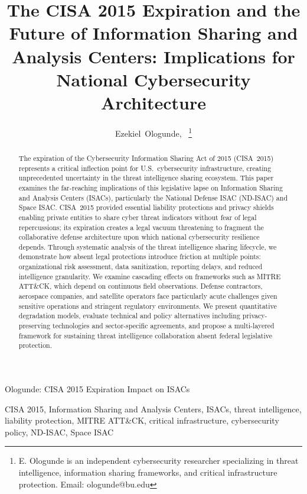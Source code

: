 \documentclass[journal]{IEEEtran}
\begin{document}
\title{The CISA 2015 Expiration and the Future of Information Sharing and Analysis Centers: Implications for National Cybersecurity Architecture}

\author{Ezekiel~Ologunde,~
\thanks{E. Ologunde is an independent cybersecurity researcher specializing in threat intelligence, information sharing frameworks, and critical infrastructure protection. Email: ologunde@bu.edu}}

\markboth{}%
{Ologunde: CISA 2015 Expiration Impact on ISACs}

\maketitle

\begin{abstract}
The expiration of the Cybersecurity Information Sharing Act of 2015 (CISA~2015) represents a critical inflection point for U.S.\ cybersecurity infrastructure, creating unprecedented uncertainty in the threat intelligence sharing ecosystem. This paper examines the far-reaching implications of this legislative lapse on Information Sharing and Analysis Centers (ISACs), particularly the National Defense ISAC (ND-ISAC) and Space ISAC. CISA~2015 provided essential liability protections and privacy shields enabling private entities to share cyber threat indicators without fear of legal repercussions; its expiration creates a legal vacuum threatening to fragment the collaborative defense architecture upon which national cybersecurity resilience depends. Through systematic analysis of the threat intelligence sharing lifecycle, we demonstrate how absent legal protections introduce friction at multiple points: organizational risk assessment, data sanitization, reporting delays, and reduced intelligence granularity. We examine cascading effects on frameworks such as MITRE ATT\&CK, which depend on continuous field observations. Defense contractors, aerospace companies, and satellite operators face particularly acute challenges given sensitive operations and stringent regulatory environments. We present quantitative degradation models, evaluate technical and policy alternatives including privacy-preserving technologies and sector-specific agreements, and propose a multi-layered framework for sustaining threat intelligence collaboration absent federal legislative protection.
\end{abstract}

\begin{IEEEkeywords}
CISA 2015, Information Sharing and Analysis Centers, ISACs, threat intelligence, liability protection, MITRE ATT\&CK, critical infrastructure, cybersecurity policy, ND-ISAC, Space ISAC
\end{IEEEkeywords}
\end{document}
